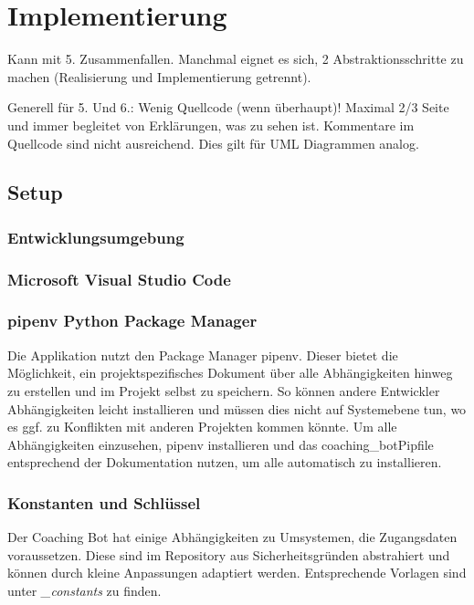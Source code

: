 \chapter{Implementierung}

Kann mit 5. Zusammenfallen. Manchmal eignet es sich, 2 Abstraktionsschritte zu machen (Realisierung und Implementierung getrennt).  
  
Generell für 5. Und 6.: Wenig Quellcode (wenn überhaupt)! Maximal 2/3 Seite und immer begleitet von Erklärungen, was zu sehen ist. Kommentare im Quellcode sind nicht ausreichend. Dies gilt für UML Diagrammen analog.  


    \section{Setup}
        \subsection{Entwicklungsumgebung}


        \subsection{Microsoft Visual Studio Code}


        \subsection{pipenv \- Python Package Manager}
            Die Applikation nutzt den Package Manager pipenv. Dieser bietet die Möglichkeit, ein projektspezifisches Dokument über alle Abhängigkeiten hinweg zu erstellen und im Projekt selbst zu speichern. So können andere Entwickler Abhängigkeiten leicht installieren und müssen dies nicht auf Systemebene tun, wo es ggf. zu Konflikten mit anderen Projekten kommen könnte.  
            Um alle Abhängigkeiten einzusehen, pipenv \cite{pipenv} installieren und das coaching\_bot\/Pipfile entsprechend der Dokumentation nutzen, um alle automatisch zu installieren.


        \subsection{Konstanten und Schlüssel}
            Der Coaching Bot hat einige Abhängigkeiten zu Umsystemen, die Zugangsdaten voraussetzen. Diese sind im Repository \cite{repo} aus Sicherheitsgründen abstrahiert und können durch kleine Anpassungen adaptiert werden. Entsprechende Vorlagen sind unter \emph{\_constants} zu finden.


